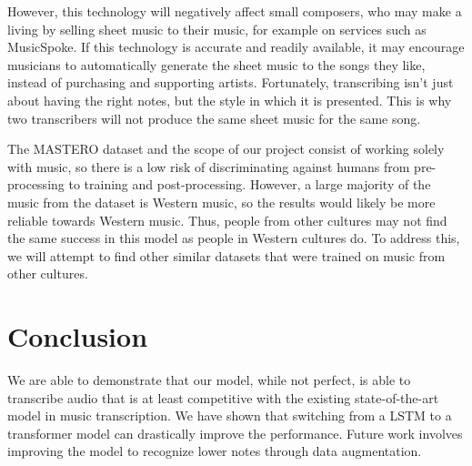 \documentclass[a4paper,twocolumn,10pt]{article}
\begin{document}
However, this technology will negatively affect small composers, who may make a living by selling sheet music to their music, for example on services such as MusicSpoke\cite{musicspoke}. If this technology is accurate and readily available, it may encourage musicians to automatically generate the sheet music to the songs they like, instead of purchasing and supporting artists. Fortunately, transcribing isn’t just about having the right notes, but the style in which it is presented. This is why two transcribers will not produce the same sheet music for the same song.

The MASTERO dataset and the scope of our project consist of working solely with music, so there is a low risk of discriminating against humans from pre-processing to training and post-processing. However, a large majority of the music from the dataset is Western music, so the results would likely be more reliable towards Western music. Thus, people from other cultures may not find the same success in this model as people in Western cultures do. To address this, we will attempt to find other similar datasets that were trained on music from other cultures.
\section{Conclusion}
We are able to demonstrate that our model, while not perfect, is able to transcribe audio that is at least competitive with the existing state-of-the-art model in music transcription. We have shown that switching from a LSTM to a transformer model can drastically improve the performance. Future work involves improving the model to recognize lower notes through data augmentation.
\printbibliography
\end{document}
